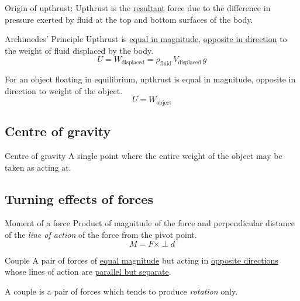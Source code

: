 \begin{remark}
Origin of upthrust: Upthrust is the \underline{resultant} force due to the difference in pressure exerted by fluid at the top and bottom surfaces of the body.
\end{remark}

\begin{defn}{Archimedes' Principle}{}
Upthrust is \underline{equal in magnitude}, \underline{opposite in direction} to the weight of fluid displaced by the body.
\begin{equation} 
    U = W_{\text{displaced}} = \rho_{\text{fluid}}\, V_{\text{displaced}}\,g 
\end{equation}
\end{defn}


For an object floating in equilibrium, upthrust is equal in magnitude, opposite in direction to weight of the object.
\begin{equation} U = W_{\mathrm{object}} \end{equation}

\subsection{Centre of gravity}
\begin{defn}{Centre of gravity}{}
A single point where the entire weight of the object may be taken as acting at.
\end{defn} 

\subsection{Turning effects of forces}
\begin{defn}{Moment of a force}{}
Product of magnitude of the force and perpendicular distance of the \emph{line of action} of the force from the pivot point.
\begin{equation} M = F \times \perp d \end{equation}
\end{defn}

\begin{defn}{Couple}{}
A pair of forces of \underline{equal magnitude} but acting in \underline{opposite directions} whose lines of action are \underline{parallel but separate}.
\end{defn} 

\begin{remark}
A couple is a pair of forces which tends to produce \emph{rotation} only.
\end{remark}

